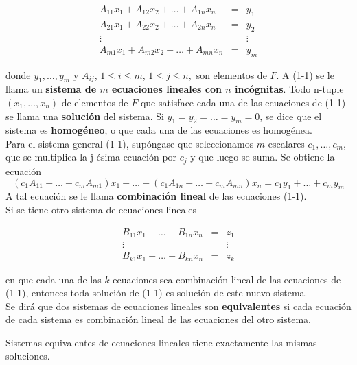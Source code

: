 \begin{equation}
    \begin{array}{ccc}
	A_{11}x_1+A_{12}x_2+\ldots + A_{1n}x_n&=&y_1\\
	A_{21}x_1+A_{22}x_2+\ldots + A_{2n}x_n&=&y_2\\
	\vdots &&\vdots\\
	A_{m1}x_1+A_{m2}x_2+\ldots + A_{mn}x_n&=&y_m
    \end{array}
\end{equation}

donde $y_1,\ldots , y_{m}$ y $A_{ij}$, $1\leq i \leq m$, $1\leq j \leq n,$ son elementos de $F$. A (1-1) se le llama un \textbf{\boldmath sistema de $m$ ecuaciones lineales con $n$ incógnitas}. Todo n-tuple $(x_1,\ldots,x_n)$ de elementos de $F$ que satisface cada una de las ecuaciones de (1-1) se llama una \textbf{solución} del sistema. Si $y_1=y_2=\ldots = y_m=0$, se dice que el sistema es \textbf{homogéneo}, o que cada una de las ecuaciones es homogénea.\\

Para el sistema general (1-1), supóngase que seleccionamos $m$ escalares $c_1,\ldots, c_m$, que se multiplica la j-ésima ecuación por $c_j$ y que luego se suma. Se obtiene la ecuación
$$(c_1 A_{11}+\ldots +c_m A_{m1})x_1+\ldots+(c_1A_{1n}+\ldots + c_mA_{mn})x_n=c_1y_1+\ldots+c_my_m$$
A tal ecuación se le llama \textbf{combinación lineal} de las ecuaciones (1-1).\\ 

Si se tiene otro sistema de ecuaciones lineales

\begin{equation}
    \begin{array}{ccc}
	B_{11}x_1+\ldots + B_{1n}x_n&=&z_1\\
	\vdots &&\vdots\\
	B_{k1}x_1+\ldots + B_{kn}x_n&=&z_k
    \end{array}
\end{equation}

en que cada una de las $k$ ecuaciones sea combinación lineal de las ecuaciones de (1-1), entonces toda solución de (1-1) es solución de este nuevo sistema.\\ 

Se dirá que dos sistemas de ecuaciones lineales son \textbf{equivalentes} si cada ecuación de cada sistema es combinación lineal de las ecuaciones del otro sistema.\\

\begin{teo}
    Sistemas equivalentes de ecuaciones lineales tiene exactamente las mismas soluciones.
\end{teo}

